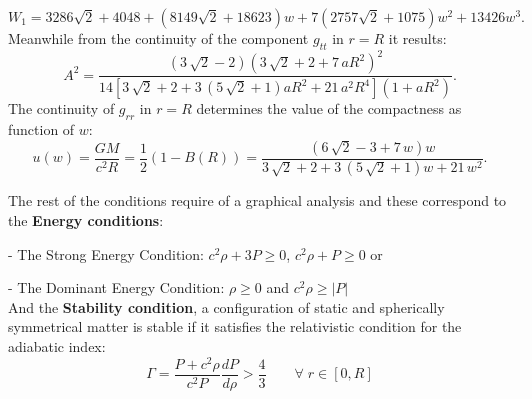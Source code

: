 \documentclass[12pt,onecolumn,a4paper]{article}
\begin{document}
$$
W_1=3286
\sqrt {2}+4048+( 8149\sqrt {2}+18623) w+7( 2757\sqrt {2}+1075) {w}^{2}+13426{w}^{3}.
$$
Meanwhile from the continuity of the component $g_{tt}$ in $r=R$ it results:
\begin{equation}
{A}^{2}={\frac { \left( 3\,\sqrt {2}-2 \right)  \left( 3\,\sqrt 
{2}+2+7\,a{R}^{2} \right) ^{2}}{ 14 \left[ 3\,\sqrt {2}+2+3\, \left( 5\,
\sqrt {2}+1 \right) a{R}^{2}+21\,{a}^{2}{R}^{4} \right]  \left( 1+a{R}
^{2} \right) }}.
 \label{yR}
\end{equation}
The continuity of $g_{rr}$ in $r=R$ determines the value of the compactness as function of $w$:
\begin{equation}
u(w)=\frac{GM}{c^2R}=\frac{1}{2}(1-B(R))= {\frac { \left( 6\,\sqrt {2}-3+7\,w \right) w}{3\,\sqrt {2}+2+3\,
 \left( 5\,\sqrt {2}+1 \right) w+21\,{w}^{2}}}.
 \label{u}
\end{equation}

\noindent
The rest of the conditions require of a graphical analysis and these correspond to the {\bf  Energy conditions}:

- The Strong Energy Condition: $ c^2\rho+3P\geq 0$, $ c^2\rho+P\geq 0$ or

- The Dominant Energy Condition: $\rho\geq 0$  and $ c^2\rho\geq |P|$\\
And the  {\bf  Stability condition}, a configuration of static and spherically symmetrical matter is stable if it satisfies the relativistic condition for the adiabatic index:
$$
\Gamma=\frac{P+c^2\rho}{c^2P}\frac{dP}{d\rho}> \frac{4}{3} \qquad \forall \;r\in[0,R]
$$
\end{document}
